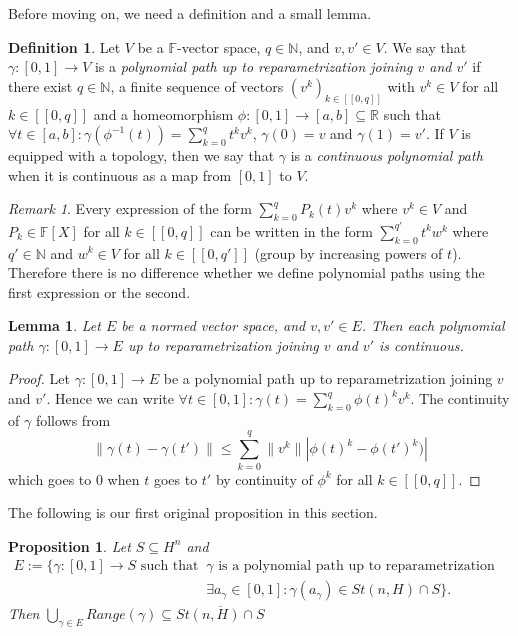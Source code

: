 \documentclass[a4paper,12pt]{article}
\theoremstyle{plain}
\newtheorem{proposition}{Proposition}[section]
\newtheorem{lemma}{Lemma}[section]
\theoremstyle{definition}
\newtheorem{definition}{Definition}[section]
\theoremstyle{remark}
\newtheorem{remark}{Remark}[section]
\begin{document}
Before moving on, we need a definition and a small lemma.

\begin{definition}
Let $V$ be a $\mathbb{F}$-vector space, $q \in \mathbb{N}$, and $v,v' \in V$. We say that $\gamma : [0,1] \to V$ is a \textit{polynomial path up to reparametrization joining $v$ and $v'$} if there exist $q \in \mathbb{N}$, a finite sequence of vectors $(v^k)_{k \in [\![0,q]\!]}$ with $v^k \in V$ for all $k \in [\![0,q]\!]$ and a homeomorphism $\phi : [0,1] \to [a,b] \subseteq \mathbb{R}$ such that $\forall t \in [a,b] : \gamma(\phi^{-1}(t)) = \sum_{k=0}^q t^k v^k$, $\gamma(0)=v$ and $\gamma(1)=v'$. If $V$ is equipped with a topology, then we say that $\gamma$ is a \textit{continuous polynomial path} when it is continuous as a map from $[0,1]$ to $V$.
\end{definition}

\begin{remark}
Every expression of the form $\sum_{k=0}^q P_k(t)v^k$ where $v^k \in V$ and $P_k \in \mathbb{F}[X]$ for all $k \in [\![0,q]\!]$ can be written in the form $\sum_{k=0}^{q'} t^k w^k$ where $q' \in \mathbb{N}$ and $w^k \in V$ for all $k \in [\![0,q']\!]$ (group by increasing powers of $t$). Therefore there is no difference whether we define polynomial paths using the first expression or the second.
\end{remark}

\begin{lemma}
\label{LemmaPolynomialPathsBoundedDegreeInNormedVectorSpaceContinuous}
Let $E$ be a normed vector space, and $v,v' \in E$. Then each polynomial path $\gamma : [0,1] \to E$ up to reparametrization joining $v$ and $v'$ is continuous.
\end{lemma}

\begin{proof}
Let $\gamma : [0,1] \to E$ be a polynomial path up to reparametrization joining $v$ and $v'$. Hence we can write $\forall t \in [0,1] : \gamma(t) = \sum_{k=0}^q \phi(t)^k v^k$. The continuity of $\gamma$ follows from
\[ \lVert \gamma(t) - \gamma(t') \rVert \leq \sum_{k=0}^q \lVert v^k \rVert |\phi(t)^k - \phi(t')^k) | \]
which goes to 0 when $t$ goes to $t'$ by continuity of $\phi^k$ for all $k \in [\![0,q]\!]$.
\end{proof}

The following is our first original proposition in this section.

\begin{proposition}
\label{PropClosureSt(n,H)CapS}
Let $S \subseteq H^n$ and 
\begin{align*}
E := \{ \gamma : [0,1] \to S \text{ such that } &\gamma \text{ is a polynomial path up to reparametrization and } \\
&\exists a_\gamma \in [0,1] : \gamma(a_\gamma) \in St(n,H) \cap S \}.
\end{align*}
Then $\bigcup_{\gamma \in E} Range(\gamma) \subseteq \overline{St(n,H) \cap S}$
\end{proposition}
\end{document}
